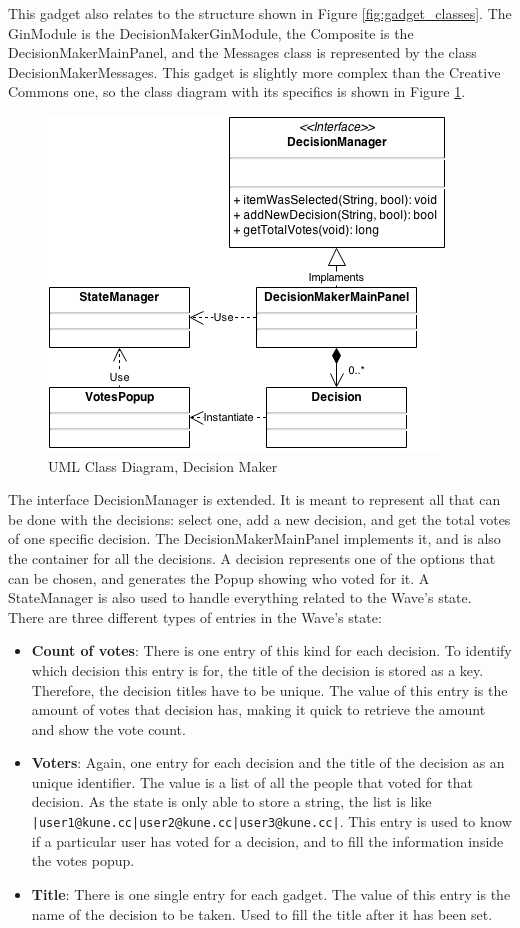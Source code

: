 This gadget also relates to the structure shown in Figure \ref{fig:gadget_classes}. The GinModule is the DecisionMakerGinModule, the Composite is the DecisionMakerMainPanel, and the Messages class is represented by the class DecisionMakerMessages. This gadget is slightly more complex than the Creative Commons one, so the class diagram with its specifics is shown in Figure \ref{fig:decision_maker_diagram}.
\begin{figure}[H]
  \center
    \includegraphics[keepaspectratio, scale=0.5]{Media/Diagrams/Gadget/DecisionMaker.png}
  \caption{UML Class Diagram, Decision Maker}
  \label{fig:decision_maker_diagram}
\end{figure}
The interface DecisionManager is extended. It is meant to represent all that can be done with the decisions: select one, add a new decision, and get the total votes of one specific decision. The DecisionMakerMainPanel implements it, and is also the container for all the decisions. A decision represents one of the options that can be chosen, and generates the Popup showing who voted for it. A StateManager is also used to handle everything related to the Wave's state.\\[.2cm]
There are three different types of entries in the Wave's state:
\begin{itemize}
  \item \textbf{Count of votes}: There is one entry of this kind for each decision. To identify which decision this entry is for, the title of the decision is stored as a key. Therefore, the decision titles have to be unique. The value of this entry is the amount of votes that decision has, making it quick to retrieve the amount and show the vote count.
  \item \textbf{Voters}: Again, one entry for each decision and the title of the decision as an unique identifier. The value is a list of all the people that voted for that decision. As the state is only able to store a string, the list is like \verb+|user1@kune.cc|user2@kune.cc|user3@kune.cc|+. This entry is used to know if a particular user has voted for a decision, and to fill the information inside the votes popup.
  \item \textbf{Title}: There is one single entry for each gadget. The value of this entry is the name of the decision to be taken. Used to fill the title after it has been set.
\end{itemize}
